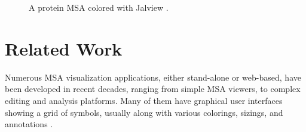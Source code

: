 \begin{figure}[hbt]
\caption[Protein MSA Colored with Jalview]{A protein MSA colored with Jalview \cite{Waterhouse:2009fk,Procter2010aa}.}\label{fig:procter-2a}
\end{figure}

\section{Related Work}

Numerous MSA visualization applications, either stand-alone or web-based, have been developed in recent decades, ranging from simple MSA viewers, to complex editing and analysis platforms. Many of them have graphical user interfaces showing a grid of symbols, usually along with various colorings, sizings, and annotations \cite{Procter2010aa}.

